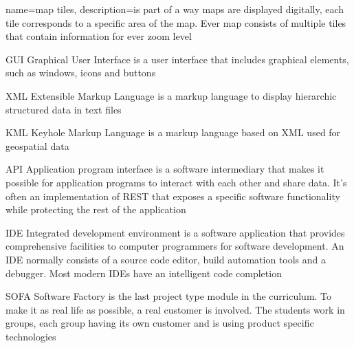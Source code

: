{
  name=map tiles,
  description={is part of a way maps are displayed digitally, each tile corresponds to a specific area of the map. Ever map consists of multiple tiles that contain information for ever zoom level}
}



  {GUI}            %
  {Graphical User Interface}  %
  {is a user interface that includes graphical elements, such as windows, icons and buttons} %

  {XML}            %
  {Extensible Markup Language}  %
  {is a markup language to display hierarchic structured data in text files} %

  {KML}            %
  {Keyhole Markup Language}  %
  {is a markup language based on XML used for geospatial data} %

	{API}            %
	{Application program interface}  %
	{is a software intermediary that makes it possible for application programs to interact with each other and share data. It's often an implementation of REST that exposes a specific software functionality while protecting the rest of the application} %
  
	{IDE}            %
	{Integrated development environment}  %
	{is a software application that provides comprehensive facilities to computer programmers for software development. An IDE normally consists of a source code editor, build automation tools and a debugger. Most modern IDEs have an intelligent code completion} %

	{SOFA}            %
	{Software Factory}  %
	{is the last project type module in the curriculum. To make it as real life as possible, a real customer is involved. The students work in groups, each group having its own customer and is using product specific technologies\cite{FoSE14}} %